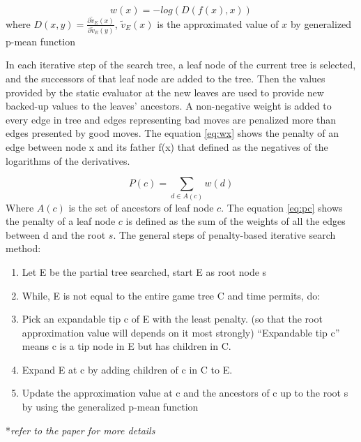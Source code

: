 \documentclass{article}
\begin{document}
\begin{equation}
w(x) = -log(D(f(x), x))
\label{eq:wx}
\end{equation}
where $D(x,y) = \frac{\partial \tilde v_E(x)}{\partial \tilde v_E(y)}$, $\tilde v_E(x)$ is the approximated value of $x$ by generalized p-mean function


In each iterative step of the search tree, a leaf node of the current tree is selected, and the successors of that leaf node are added to the tree. Then the values provided by the static evaluator at the new leaves are used to provide new backed-up values to the leaves' ancestors. A non-negative weight is added to every edge in tree and edges representing bad moves are penalized more than edges presented by good moves. The equation \ref{eq:wx} shows the penalty of an edge between node x and its father f(x) that defined as the negatives of the logarithms of the derivatives.


\begin{equation}
P(c) = \sum_{d\in A(c)} w(d)
\label{eq:pc}
\end{equation}
Where $A(c)$ is the set of ancestors of leaf node $c$. The equation \ref{eq:pc} shows the penalty of a leaf node $c$ is defined as the sum of the weights of all the edges between d and the root $s$. The general steps of penalty-based iterative search method:
\begin{enumerate}
\item Let E be the partial tree searched, start E as root node s
\item While, E is not equal to the entire game tree C and time permits, do:
\item Pick an expandable tip c of E with the least penalty. (so that the root approximation
value will depends on it most strongly) “Expandable tip c” means c is a tip node in E but
has children in C.
\item Expand E at c by adding children of c in C to E.
\item Update the approximation value at c and the ancestors of c up to the root s by using the
generalized p-mean function
\end{enumerate}

*\emph{refer to the paper \cite{Rivest:1987:GTS:42942.42945} for more details}
{}

\end{document}
